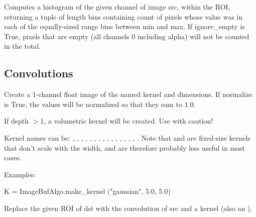  
\apiend

Computes a histogram of the given {\cf channel} of image {\cf src}, within
the ROI, returning a tuple of length {\cf bins} containing count of pixels
whose value was in each of the equally-sized range bins between {\cf min}
and {\cf max}. If {\cf ignore_empty} is {\cf True}, pixels that are empty
(all channels 0 including alpha) will not be counted in the total.



\subsection{Convolutions}
\label{sec:iba:py:convolutions}

 
Create a 1-channel {\cf float} image of the named kernel
and dimensions.  If {\cf normalize} is {\cf True}, the values will be
normalized so that they sum to $1.0$.

If {\cf depth} $> 1$, a volumetric kernel will be created.  Use with
caution!

Kernel names can be: , , ,
, , , ,
, , , , ,
, , , . Note that
 and  are fixed-size kernels that don't
scale with the width, and are therefore probably less useful in most
cases.

\smallskip
\noindent Examples:
\begin{code}
    K = ImageBufAlgo.make_kernel ("gaussian", 5.0, 5.0)
\end{code}
\apiend


 
Replace the given ROI of {\cf dst} with the convolution of {\cf src} and
a kernel (also an \ImageBuf).

